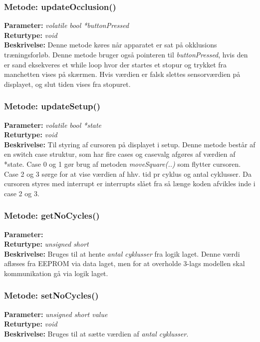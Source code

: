 \subsubsection{Metode: updateOcclusion()}
\textbf{Parameter: } \textit{volatile bool *buttonPressed}
\\ \textbf{Returtype: } \textit{void}
\\ \textbf{Beskrivelse: } Denne metode køres når apparatet er sat på okklusions træningsforløb. Denne metode bruger også pointeren til \textit{buttonPressed}, hvis den er sand eksekveres et while loop hvor der startes et stopur og trykket fra manchetten vises på skærmen. Hvis værdien er falsk slettes sensorværdien på displayet, og slut tiden vises fra stopuret.

\subsubsection{Metode: updateSetup()}
\textbf{Parameter: } \textit{volatile bool *state}
\\ \textbf{Returtype: } \textit{void}
\\ \textbf{Beskrivelse: } Til styring af cursoren på displayet i setup. Denne metode består af en switch case struktur, som har fire cases og casevalg afgøres af værdien af *state. Case 0 og 1 gør brug af metoden \textit{moveSquare(..)} som flytter cursoren. Case 2 og 3 sørge for at vise værdien af hhv. tid pr cyklus og antal cyklusser. Da cursoren styres med interrupt er interrupts slået fra så længe koden afvikles inde i case 2 og 3. 

\subsubsection{Metode: getNoCycles()}
\textbf{Parameter: } 
\\ \textbf{Returtype: } \textit{unsigned short}
\\ \textbf{Beskrivelse: } Bruges til at hente \textit{antal cyklusser} fra logik laget. Denne værdi aflæses fra EEPROM via data laget, men for at overholde 3-lags modellen skal kommunikation gå via logik laget. 

\subsubsection{Metode: setNoCycles()}
\textbf{Parameter: } \textit{unsigned short value}
\\ \textbf{Returtype: } \textit{void}
\\ \textbf{Beskrivelse: } Bruges til at sætte værdien af \textit{antal cyklusser}. 

